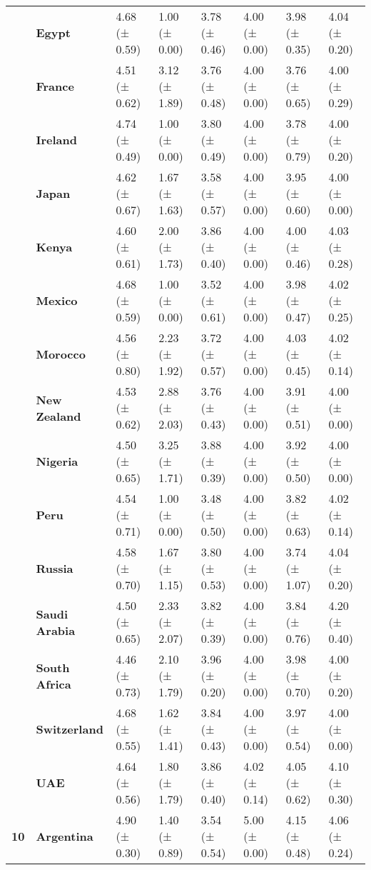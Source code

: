 \begin{longtable}{llllllll}
\textbf{} & \textbf{Egypt} & 4.68 (± 0.59) & 1.00 (± 0.00) & 3.78 (± 0.46) & 4.00 (± 0.00) & 3.98 (± 0.35) & 4.04 (± 0.20) \\
\textbf{} & \textbf{France} & 4.51 (± 0.62) & 3.12 (± 1.89) & 3.76 (± 0.48) & 4.00 (± 0.00) & 3.76 (± 0.65) & 4.00 (± 0.29) \\
\textbf{} & \textbf{Ireland} & 4.74 (± 0.49) & 1.00 (± 0.00) & 3.80 (± 0.49) & 4.00 (± 0.00) & 3.78 (± 0.79) & 4.00 (± 0.20) \\
\textbf{} & \textbf{Japan} & 4.62 (± 0.67) & 1.67 (± 1.63) & 3.58 (± 0.57) & 4.00 (± 0.00) & 3.95 (± 0.60) & 4.00 (± 0.00) \\
\textbf{} & \textbf{Kenya} & 4.60 (± 0.61) & 2.00 (± 1.73) & 3.86 (± 0.40) & 4.00 (± 0.00) & 4.00 (± 0.46) & 4.03 (± 0.28) \\
\textbf{} & \textbf{Mexico} & 4.68 (± 0.59) & 1.00 (± 0.00) & 3.52 (± 0.61) & 4.00 (± 0.00) & 3.98 (± 0.47) & 4.02 (± 0.25) \\
\textbf{} & \textbf{Morocco} & 4.56 (± 0.80) & 2.23 (± 1.92) & 3.72 (± 0.57) & 4.00 (± 0.00) & 4.03 (± 0.45) & 4.02 (± 0.14) \\
\textbf{} & \textbf{New Zealand} & 4.53 (± 0.62) & 2.88 (± 2.03) & 3.76 (± 0.43) & 4.00 (± 0.00) & 3.91 (± 0.51) & 4.00 (± 0.00) \\
\textbf{} & \textbf{Nigeria} & 4.50 (± 0.65) & 3.25 (± 1.71) & 3.88 (± 0.39) & 4.00 (± 0.00) & 3.92 (± 0.50) & 4.00 (± 0.00) \\
\textbf{} & \textbf{Peru} & 4.54 (± 0.71) & 1.00 (± 0.00) & 3.48 (± 0.50) & 4.00 (± 0.00) & 3.82 (± 0.63) & 4.02 (± 0.14) \\
\textbf{} & \textbf{Russia} & 4.58 (± 0.70) & 1.67 (± 1.15) & 3.80 (± 0.53) & 4.00 (± 0.00) & 3.74 (± 1.07) & 4.04 (± 0.20) \\
\textbf{} & \textbf{Saudi Arabia} & 4.50 (± 0.65) & 2.33 (± 2.07) & 3.82 (± 0.39) & 4.00 (± 0.00) & 3.84 (± 0.76) & 4.20 (± 0.40) \\
\textbf{} & \textbf{South Africa} & 4.46 (± 0.73) & 2.10 (± 1.79) & 3.96 (± 0.20) & 4.00 (± 0.00) & 3.98 (± 0.70) & 4.00 (± 0.20) \\
\textbf{} & \textbf{Switzerland} & 4.68 (± 0.55) & 1.62 (± 1.41) & 3.84 (± 0.43) & 4.00 (± 0.00) & 3.97 (± 0.54) & 4.00 (± 0.00) \\
\textbf{} & \textbf{UAE} & 4.64 (± 0.56) & 1.80 (± 1.79) & 3.86 (± 0.40) & 4.02 (± 0.14) & 4.05 (± 0.62) & 4.10 (± 0.30) \\
\cline{1-8}
\multirow[t]{19}{*}{\textbf{10}} & \textbf{Argentina} & 4.90 (± 0.30) & 1.40 (± 0.89) & 3.54 (± 0.54) & 5.00 (± 0.00) & 4.15 (± 0.48) & 4.06 (± 0.24) \\

\end{longtable}
